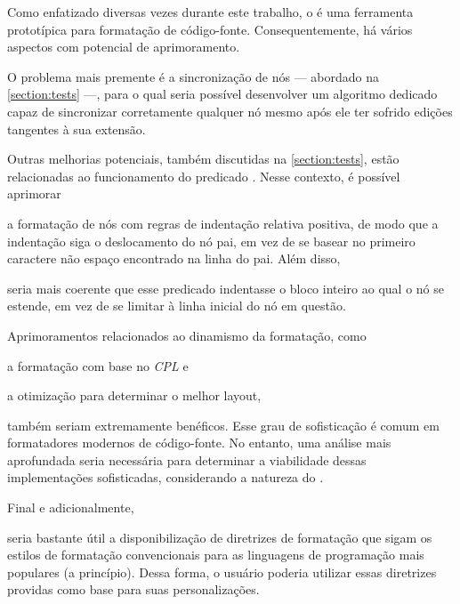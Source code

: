 \documentclass
  [11pt,a4paper,english,brazil,openright,sumario=tradicional,twoside]
  {abntex2}
\begin{document}
  Como enfatizado diversas vezes durante este trabalho, o \witchcooking é uma
  ferramenta prototípica para formatação de código-fonte. Consequentemente, há
  vários aspectos com potencial de aprimoramento.
  \begin{inparaenum}
    \item O problema mais premente é a sincronização de nós --- abordado na
          \cref{section:tests} ---, para o qual seria possível desenvolver um
          algoritmo dedicado capaz de sincronizar corretamente qualquer nó
          mesmo após ele ter sofrido edições tangentes à sua extensão.

          Outras melhorias potenciais, também discutidas na
          \cref{section:tests}, estão relacionadas ao funcionamento do
          predicado . Nesse contexto, é possível
          aprimorar
    \item a formatação de nós com regras de indentação relativa positiva, de
          modo que a indentação siga o deslocamento do nó pai, em vez de se
          basear no primeiro caractere não espaço encontrado na linha do pai.
          Além disso,
    \item seria mais coerente que esse predicado indentasse o bloco inteiro ao
          qual o nó se estende, em vez de se limitar à linha inicial do nó em
          questão.

    \item Aprimoramentos relacionados ao dinamismo da formatação, como
          \begin{inparaenum}
            \item a formatação com base no \textit{CPL} e
            \item a otimização para determinar o melhor layout,
          \end{inparaenum}
          também seriam extremamente benéficos. Esse grau de sofisticação é
          comum em formatadores modernos de código-fonte. No entanto, uma
          análise mais aprofundada seria necessária para determinar a
          viabilidade dessas implementações sofisticadas, considerando a
          natureza do \witchcooking.

          Final e adicionalmente,
    \item seria bastante útil a disponibilização de
          diretrizes de formatação que sigam os estilos de formatação
          convencionais para as linguagens de programação mais populares
          (a princípio). Dessa forma, o usuário poderia utilizar essas
          diretrizes providas como base para suas personalizações.
  \end{inparaenum}
\end{document}
